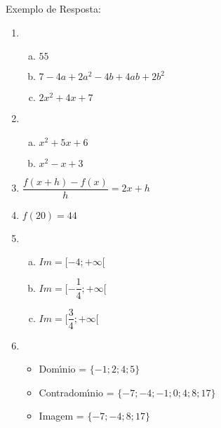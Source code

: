 
Exemplo de Resposta:
\begin{res}
    \begin{multicols}{2}

        \begin{enumerate}[(1)]

            \item
                \begin{enumerate}[(a)]
                    \item $55$
                    \item $7 - 4 a + 2 a^{2} - 4 b + 4 a b + 2 b^{2}$
                    \item $2x^{2}+4x+7$
                \end{enumerate}

            \item
                \begin{enumerate}[(a)]
                    \item $x^{2}+5x+6$
                    \item $x^{2}-x+3$
                \end{enumerate}

            \item $\dfrac{f\left( x+h\right) -f\left( x\right) }{h}=2x+h$

            \item $f\left( 20\right)=44$

            \item
                \begin{enumerate}[(a)]
                    \item $Im=[-4;+\infty[$
                    \item $Im=[-\dfrac{1}{4};+\infty[$
                    \item $Im=[\dfrac{3}{4};+\infty[$
                \end{enumerate}
            \columnbreak
            \item
                \begin{itemize}
                    \item Dom\'{\i}nio = $\{ -1;2;4;5\}$
                    \item Contradom\'{\i}nio = $\{-7;-4;-1;0;4;8;17\}$
                    \item Imagem = $\{-7;-4;8;17\}$
              \end{itemize}


\end{enumerate}
\end{multicols}
\end{res}

